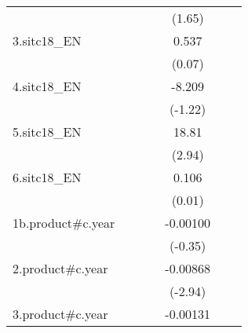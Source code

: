 {\begin{tabular}{l*{6}{c}}
                    &                     &                     &                     &      (1.65)         &                     &                     \\
[1em]
3.sitc18\_EN         &                     &                     &                     &       0.537         &                     &                     \\
                    &                     &                     &                     &      (0.07)         &                     &                     \\
[1em]
4.sitc18\_EN         &                     &                     &                     &      -8.209         &                     &                     \\
                    &                     &                     &                     &     (-1.22)         &                     &                     \\
[1em]
5.sitc18\_EN         &                     &                     &                     &       18.81\sym{**} &                     &                     \\
                    &                     &                     &                     &      (2.94)         &                     &                     \\
[1em]
6.sitc18\_EN         &                     &                     &                     &       0.106         &                     &                     \\
                    &                     &                     &                     &      (0.01)         &                     &                     \\
[1em]
1b.product#c.year   &                     &                     &                     &    -0.00100         &                     &                     \\
                    &                     &                     &                     &     (-0.35)         &                     &                     \\
[1em]
2.product#c.year    &                     &                     &                     &    -0.00868\sym{**} &                     &                     \\
                    &                     &                     &                     &     (-2.94)         &                     &                     \\
[1em]
3.product#c.year    &                     &                     &                     &    -0.00131         &                     &                     \\

\end{tabular}}
